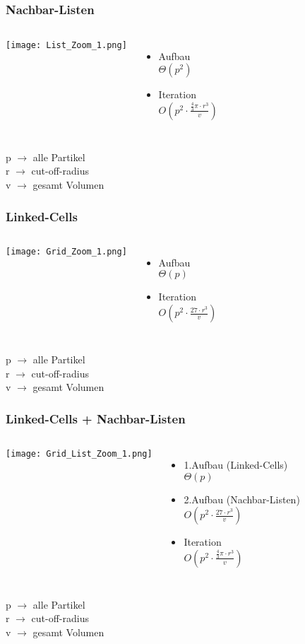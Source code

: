 \documentclass[compress]{beamer}
\begin{document}
\subsection{}
\begin{frame}
	\frametitle{Nachbar-Listen}
	\begin{columns}
		\centering
			\texttt{[image: List\_Zoom\_1.png]}
		\begin{itemize}
			\item Aufbau\\ $\Theta\left(p^2\right)$
			\item Iteration \\$O\left(p^2\cdot \frac{\frac{4}{3}\pi\cdot r^3}{v}\right)$
		\end{itemize}
	\end{columns} 
p $\rightarrow$ alle Partikel\\
r $\rightarrow$ cut-off-radius \\
v $\rightarrow$ gesamt Volumen
\end{frame}
\begin{frame}
	\frametitle{Linked-Cells}
	\begin{columns}
		\column{0.6\linewidth}
		\centering
		\texttt{[image: Grid\_Zoom\_1.png]}
		\column{0.4\linewidth}
		\begin{itemize}
			\item Aufbau\\ $\Theta\left(p\right)$
			\item Iteration \\$O\left(p^2\cdot \frac{27 \cdot r^3}{v}\right)$
		\end{itemize}
	\end{columns} 
p $\rightarrow$ alle Partikel\\
r $\rightarrow$ cut-off-radius \\
v $\rightarrow$ gesamt Volumen
\end{frame}
\begin{frame}
	\frametitle{Linked-Cells + Nachbar-Listen}
	\begin{columns}
		\centering
		\texttt{[image: Grid\_List\_Zoom\_1.png]}
		\begin{itemize}
			\item 1.Aufbau (Linked-Cells) \\ $\Theta\left(p\right)$
			\item 2.Aufbau (Nachbar-Listen) \\$O\left(p^2\cdot \frac{27 \cdot r^3}{v}\right)$
			\item Iteration \\$O\left(p^2\cdot \frac{\frac{4}{3}\pi\cdot r^3}{v}\right)$
		\end{itemize}
	\end{columns} 
p $\rightarrow$ alle Partikel\\
r $\rightarrow$ cut-off-radius \\
v $\rightarrow$ gesamt Volumen
\end{frame}
\end{document}
